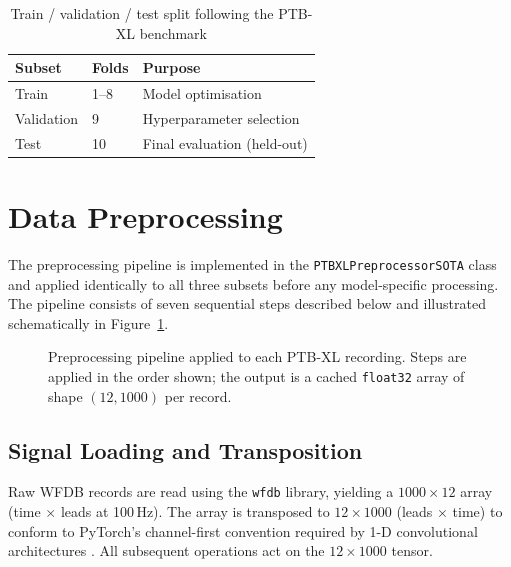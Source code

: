 \begin{table}[htbp]
  \centering
  \caption{Train / validation / test split following the PTB-XL benchmark}
  \label{tab:splits}
  \begin{tabular}{lll}
    \hline
    \textbf{Subset} & \textbf{Folds} & \textbf{Purpose}            \\
    \hline
    Train           & 1--8           & Model optimisation          \\
    Validation      & 9              & Hyperparameter selection    \\
    Test            & 10             & Final evaluation (held-out) \\
    \hline
  \end{tabular}
\end{table}

\section{Data Preprocessing}
\label{sec:preprocessing}

The preprocessing pipeline is implemented in the
\texttt{PTBXLPreprocessorSOTA} class and applied identically to all three
subsets before any model-specific processing.
The pipeline consists of seven sequential steps described below and
illustrated schematically in Figure~\ref{fig:preprocess_pipeline}.

\begin{figure}[htbp]
  \centering
  \caption{Preprocessing pipeline applied to each PTB-XL recording.
    Steps are applied in the order shown; the output is a cached
    \texttt{float32} array of shape $(12, 1000)$ per record.}
  \label{fig:preprocess_pipeline}
\end{figure}

\subsection{Signal Loading and Transposition}

Raw WFDB records are read using the \texttt{wfdb} library, yielding a
$1000 \times 12$ array (time $\times$ leads at 100\,Hz).
The array is transposed to $12 \times 1000$ (leads $\times$ time) to
conform to PyTorch's channel-first convention required by 1-D
convolutional architectures \cite{ref29,ref21}.
All subsequent operations act on the $12 \times 1000$ tensor.

